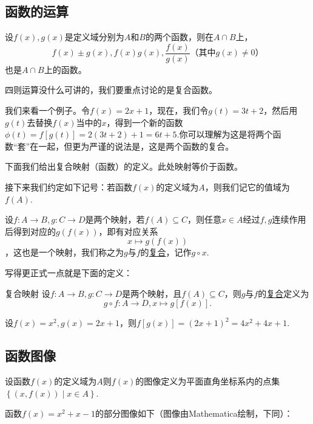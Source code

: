 \documentclass[lang=cn,math=cm,chinesefont=nofont,11pt,scheme=chinese,onecol]{elegantbook}
\begin{document}
\subsection{函数的运算}

设$f(x),g(x)$是定义域分别为$A$和$B$的两个函数，则在$A\cap B$上，$$f(x)\pm g(x),f(x)g(x),\dfrac{f(x)}{g(x)}\text{（其中}g(x)\neq 0\text{）}$$也是$A\cap B$上的函数。

四则运算没什么可讲的，我们要重点讨论的是复合函数。

我们来看一个例子。令$f(x)=2x+1$，现在，我们令$g(t)=3t+2$，然后用$g(t)$去替换$f(x)$当中的$x$，得到一个新的函数$\phi(t)=f[g(t)]=2(3t+2)+1=6t+5$.你可以理解为这是将两个函数“套”在一起，但更为严谨的说法是，这是两个函数的复合。

下面我们给出复合映射（函数）的定义。此处映射等价于函数。

\begin{remark}
  接下来我们约定如下记号：若函数$f(x)$的定义域为$A$，则我们记它的值域为$f(A)$.
\end{remark}

设$f:A\rightarrow B,g:C\rightarrow D$是两个映射，若$f(A)\subseteq C$，则任意$x\in A$经过$f,g$连续作用后得到对应的$g(f(x))$，即有对应关系$$x\mapsto g(f(x))$$，这也是一个映射，我们称之为$g$与$f$的\underline{复合}，记作$g\circ x$.

写得更正式一点就是下面的定义：

\begin{definition}{复合映射}
  设$f:A\rightarrow B,g:C\rightarrow D$是两个映射，且$f(A)\subseteq C$，则$g$与$f$的\underline{复合}定义为$$g\circ f:A\rightarrow D,x\mapsto g[f(x)].$$
\end{definition}

\begin{example}
  设$f(x)=x^2,g(x)=2x+1$，则$f[g(x)]=(2x+1)^2=4x^2+4x+1$.
\end{example}

\subsection{函数图像}

\begin{definition}
  设函数$f(x)$的定义域为$A$则$f(x)$的图像定义为平面直角坐标系内的点集$\left\{(x,f(x))\mid x\in A\right\}$.
\end{definition}

\begin{example}
  函数$f(x)=x^2+x-1$的部分图像如下（图像由Mathematica绘制，下同）：
\end{example}
\end{document}
